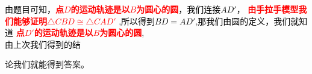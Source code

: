 \documentclass{article}
\begin{document}
\begin{flushleft}
\hspace*{2em}\textcolor{black}{由题目可知，}\textbf{\textcolor{red}{点$D$的运动轨迹是以$B$为圆心的圆}}\textcolor{black}{，我们连接$AD'$，}
\textbf{\textcolor{red}{由手拉手模型我们能够证明$\bigtriangleup CBD \cong \bigtriangleup CAD'$}}
\textcolor{black}{,所以得到$BD=AD'$,那我们由圆的定义，我们就知道}
\textbf{\textcolor{red}{点$D'$的运动轨迹是以$B$为圆心的圆}},\\
\textcolor{black}{由上次我们得到的结}\par 论我们就能得到答案。
\end{flushleft}
\end{document}
